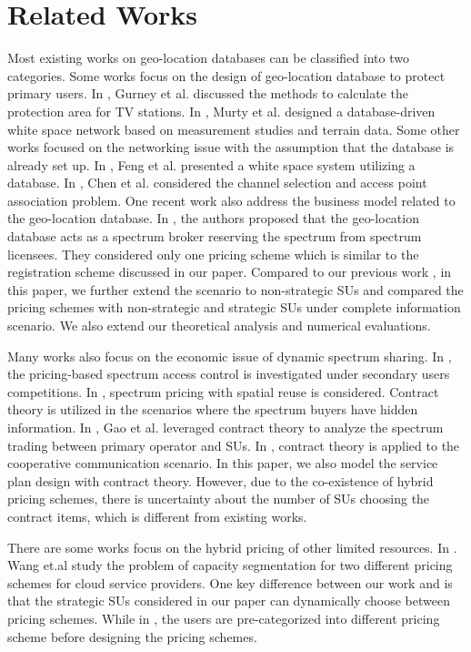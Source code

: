 \documentclass[journal]{IEEEtran}
\begin{document}
\section{Related Works}
\label{sec:related_works}

Most existing works on geo-location databases can be classified into two categories. Some works focus on the design of geo-location database to protect primary users. In \cite{database_dyspan08}, Gurney et al. discussed the methods to calculate the protection area for TV stations. In \cite{database_dyspan11}, Murty et al. designed a database-driven white space network based on measurement studies and terrain data. Some other works focused on the networking issue with the assumption that the database is already set up. In \cite{database}, Feng et al. presented a white space system utilizing a database. In \cite{database_icdcs12}, Chen et al. considered the channel selection and access point association problem.
One recent work \cite{database_icc12} also address the business model related to the geo-location database. In \cite{database_icc12}, the authors proposed that the geo-location database acts as a spectrum broker reserving the spectrum from spectrum licensees. They considered only one pricing scheme which is similar to the registration scheme discussed in our paper.
Compared to our previous work \cite{databasePricing}, in this paper, we further extend the scenario to non-strategic SUs and compared the pricing schemes with non-strategic and strategic SUs under complete information scenario. We also extend our theoretical analysis and numerical evaluations.

Many works also focus on the economic issue of dynamic spectrum sharing. In \cite{add1}, the pricing-based spectrum access control is investigated under secondary users competitions. In \cite{add2}, spectrum pricing with spatial reuse is considered. Contract theory is utilized in the scenarios where the spectrum buyers have hidden information. In \cite{JSAC10}, Gao et al. leveraged contract theory to analyze the spectrum trading between primary operator and SUs. In \cite{dyspan11Duan}, contract theory is applied to the cooperative communication scenario. In this paper, we also model the service plan design with contract theory. However, due to the co-existence of hybrid pricing schemes, there is uncertainty about the number of SUs choosing the contract items, which is different from existing works.

There are some works focus on the hybrid pricing of other limited resources. In \cite{icdcs12segmentation}. Wang et.al study the problem of capacity segmentation for two different pricing schemes for cloud service providers. One key difference between our work and \cite{icdcs12segmentation} is that the strategic SUs considered in our paper can dynamically choose between pricing schemes. While in \cite{icdcs12segmentation}, the users are pre-categorized into different pricing scheme before designing the pricing schemes.
\end{document}
